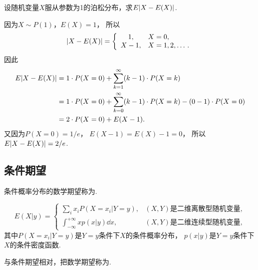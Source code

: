 \begin{example}
设随机变量\(X\)服从参数为1的泊松分布，求\(E\abs{X-E(X)}\).
\begin{solution}
因为\(X \sim P(1)\)，\(E(X) = 1\)，
所以\begin{equation*}
	\abs{X-E(X)} = \left\{ \begin{array}{cl}
		1, & X=0, \\
		X - 1, & X=1,2,\dotsc.
	\end{array} \right.
\end{equation*}
因此\begin{align*}
	E\abs{X-E(X)}
	&= 1 \cdot P(X=0)
	+ \sum_{k=1}^\infty (k-1) \cdot P(X=k) \\
	&= 1 \cdot P(X=0)
	+ \sum_{k=0}^\infty (k-1) \cdot P(X=k)
	- (0-1) \cdot P(X=0) \\
	&= 2 \cdot P(X=0)
	+ E(X-1).
\end{align*}
又因为\(P(X=0)=1/e\)，
\(E(X-1) = E(X) - 1 = 0\)，
所以\(E\abs{X-E(X)} = 2/e\).
\end{solution}
\end{example}

\subsection{条件期望}
\begin{definition}
条件概率分布的数学期望称为.
\end{definition}
\begin{equation}
	E(X \vert y)
	= \left\{ \begin{array}{cl}
		\sum_i x_i P(X=x_i \vert Y = y),
		& \text{$(X,Y)$是二维离散型随机变量}, \\
		\int_{-\infty}^{+\infty} x p(x \vert y) \dd{x},
		& \text{$(X,Y)$是二维连续型随机变量},
	\end{array} \right.
\end{equation}
其中\(P(X=x_i \vert Y=y)\)是\(Y=y\)条件下\(X\)的条件概率分布，
\(p(x \vert y)\)是\(Y=y\)条件下\(X\)的条件密度函数.

与条件期望相对，把数学期望称为.

